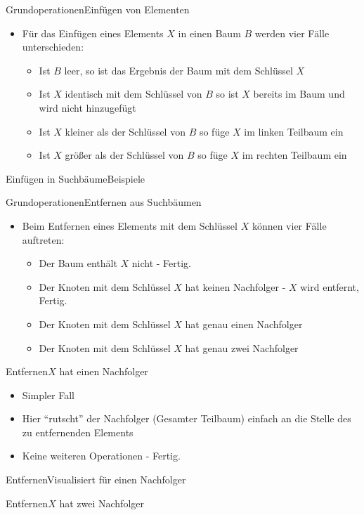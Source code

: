 \begin{frame}{Grundoperationen}{Einfügen von Elementen}
	\begin{itemize}
		\item Für das Einfügen eines Elements $X$ in einen Baum $B$ werden vier Fälle unterschieden:
		\begin{itemize}
			\item Ist $B$ leer, so ist das Ergebnis der Baum mit dem Schlüssel $X$
			\item Ist $X$ identisch mit dem Schlüssel von $B$ so ist $X$ bereits im Baum und wird nicht hinzugefügt
			\item Ist $X$ kleiner als der Schlüssel von $B$ so füge $X$ im linken Teilbaum ein
			\item Ist $X$ größer als der Schlüssel von $B$ so füge $X$ im rechten Teilbaum ein
		\end{itemize}
	\end{itemize}
\end{frame}

\begin{frame}{Einfügen in Suchbäume}{Beispiele}
\end{frame}

\begin{frame}{Grundoperationen}{Entfernen aus Suchbäumen}
\begin{itemize}
	\item Beim Entfernen eines Elements mit dem Schlüssel $X$ können vier Fälle auftreten:
	\begin{itemize}
		\item Der Baum enthält $X$ nicht - Fertig.
		\item Der Knoten mit dem Schlüssel $X$ hat keinen Nachfolger - $X$ wird entfernt, Fertig.
		\item Der Knoten mit dem Schlüssel $X$ hat genau einen Nachfolger
		\item Der Knoten mit dem Schlüssel $X$ hat genau zwei Nachfolger
	\end{itemize}
\end{itemize}
\end{frame}

\begin{frame}{Entfernen}{$X$ hat einen Nachfolger}
	\begin{itemize}
		\item Simpler Fall
		\item Hier "`rutscht"' der Nachfolger (Gesamter Teilbaum) einfach an die Stelle des zu entfernenden Elements
		\item Keine weiteren Operationen - Fertig.
	\end{itemize}
\end{frame}

\begin{frame}{Entfernen}{Visualisiert für einen Nachfolger}
\end{frame}

\begin{frame}{Entfernen}{$X$ hat zwei Nachfolger}
\end{frame}